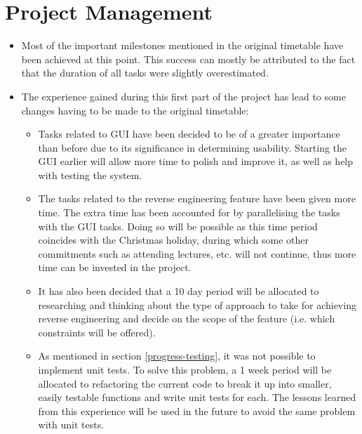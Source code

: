 \documentclass{article}
\begin{document}
	
	
	
	\section{Project Management}
	\begin{itemize}
		\item Most of the important milestones mentioned in the original timetable have been achieved at this point. This success can mostly be attributed to the fact that the duration of all tasks were slightly overestimated.
		\item The experience gained during this first part of the project has lead to some changes having to be made to the original timetable:
		\begin{itemize}
			\item Tasks related to GUI have been decided to be of a greater importance than before due to its significance in determining usability. Starting the GUI earlier will allow more time to polish and improve it, as well as help with testing the system.
			\item The tasks related to the reverse engineering feature have been given more time. The extra time has been accounted for by parallelising the tasks with the GUI tasks. Doing so will be possible as this time period coincides with the Christmas holiday, during which some other commitments such as attending lectures, etc. will not continue, thus more time can be invested in the project.
			\item It has also been decided that a 10 day period will be allocated to researching and thinking about the type of approach to take for achieving reverse engineering and decide on the scope of the feature (i.e. which constraints will be offered).
			\item As mentioned in section \ref{progress-testing}, it was not possible to implement unit tests. To solve this problem, a 1 week period will be allocated to refactoring the current code to break it up into smaller, easily testable functions and write unit tests for each. The lessons learned from this experience will be used in the future to avoid the same problem with unit tests.
		\end{itemize}
		
	\end{itemize}
	
\end{document}
